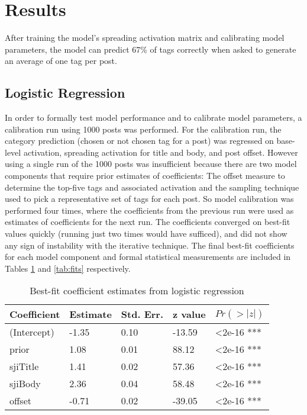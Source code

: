 \documentclass[10pt,letterpaper]{article}
\begin{document}
\section{Results}

After training the model's spreading activation matrix and calibrating model parameters, the model can predict 67\% of tags correctly when asked to generate an average of one tag per post.

\subsection{Logistic Regression}

In order to formally test model performance and to calibrate model parameters, a calibration run using \num{1000} posts was performed.
For the calibration run, the category prediction (chosen or not chosen tag for a post) was regressed on base-level activation, spreading activation for title and body, and post offset.
However using a single run of the \num{1000} posts was insufficient because there are two model components that require prior estimates of coefficients:
The offset measure to determine the top-five tags and associated activation and the sampling technique used to pick a representative set of tags for each post.
So model calibration was performed four times, where the coefficients from the previous run were used as estimates of coefficients for the next run.
The coefficients converged on best-fit values quickly (running just two times would have sufficed), and did not show any sign of instability with the iterative technique.
The final best-fit coefficients for each model component and formal statistical measurements are included in Tables \ref{tab:coeffs} and \ref{tab:fits} respectively.

\renewcommand{\arraystretch}{1}%
\renewcommand{\tabcolsep}{1mm}
\begin{table}[!ht]
  \begin{center} 
    \caption{Best-fit coefficient estimates from logistic regression} 
    \label{tab:coeffs} 
    \vskip 0.12in
    \begin{tabular}{lllll} 
      \hline
      Coefficient & 	Estimate &	Std. Err. &	z value &	$Pr(>|z|)$  \\
      \hline
      (Intercept) &	-1.35 &		0.10 &		-13.59 &	\textless2e-16 *** \\
      prior &		1.08 & 		0.01 &		88.12 & 	\textless2e-16 *** \\
      sjiTitle &	1.41 &		0.02 &		57.36 &		\textless2e-16 *** \\
      sjiBody &		2.36 &		0.04 &		58.48 &		\textless2e-16 *** \\
      offset &		-0.71 &		0.02 &		-39.05 &	\textless2e-16 *** \\
      \hline
    \end{tabular} 
  \end{center} 
\end{table}
\end{document}
